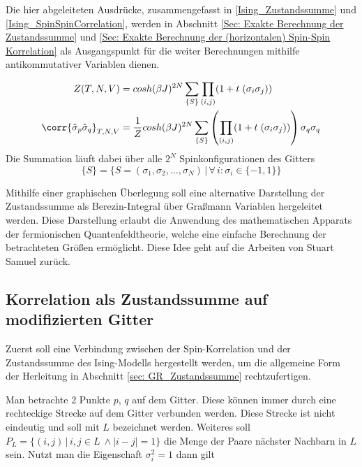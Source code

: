 \noindent Die hier abgeleiteten Ausdrücke, zusammengefasst in  \eqref{Ising_Zustandssumme} und \eqref{Ising_SpinSpinCorrelation}, werden in Abschnitt \ref{Sec: Exakte Berechnung der Zustandssumme} und \ref{Sec: Exakte Berechnung der (horizontalen) Spin-Spin Korrelation} als Ausgangspunkt für die weiter Berechnungen mithilfe antikommutativer Variablen dienen.

\begin{grayframe}[frametitle = {Zustandssumme und Spin-Spin-Korrelation für 2d Ising-Modell}]
\begin{align}
 Z(T,N,V)  
  & = cosh(\beta J)^{2N} \sum_{\{S\}} \prod_{(i,j)} (1 +  t \; (\sigma_i \sigma_j)) \label{Ising_Zustandssumme} \\
\corr{\hat{\sigma}_{p} \hat{\sigma}_{q} }_{T,N,V} 
  & = \frac{1}{Z} cosh(\beta J)^{2N} \sum_{\{S\}} \left(\prod_{(i,j)} (1 +  t \; (\sigma_i \sigma_j) )\right) \sigma_{q} \sigma_{q} \label{Ising_SpinSpinCorrelation}
\end{align}
\centering
\noindent Die Summation läuft dabei über alle $2^N$ Spinkonfigurationen des Gitters
$$\{S\} = \{S = (\sigma_1, \sigma_2, \dots,\sigma_N) \,\vert\, \forall\,i : \sigma_i \in \{-1, 1\}\}$$
\end{grayframe}


Mithilfe einer graphischen Überlegung soll eine alternative Darstellung der Zustandssumme als Berezin-Integral über Graßmann Variablen hergeleitet werden. Diese Darstellung erlaubt die Anwendung des mathematischen Apparats der fermionischen Quantenfeldtheorie, welche eine einfache Berechnung der betrachteten Größen ermöglicht. Diese Idee geht auf die Arbeiten von Stuart Samuel zurück. 

\subsection{Korrelation als Zustandssumme auf modifizierten Gitter} 
Zuerst soll eine Verbindung zwischen der Spin-Korrelation und der Zustandssumme des Ising-Modells hergestellt werden, um die allgemeine Form der Herleitung in Abschnitt \ref{sec: GR_Zustandssumme} rechtzufertigen.

\noindent Man betrachte 2 Punkte $p$, $q$ auf dem Gitter. Diese können immer durch eine rechteckige Strecke auf dem Gitter verbunden werden. Diese Strecke ist nicht eindeutig und soll mit $L$ bezeichnet werden. Weiteres soll $P_L = \{ (i,j) \,|\, i,j \in L\ \wedge |i-j| = 1 \}$ die Menge der Paare nächster Nachbarn in $L$ sein. Nutzt man die Eigenschaft  $\sigma_{i}^{2} = 1$ dann gilt

